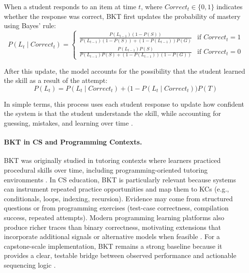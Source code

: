 \documentclass{article}
\begin{document}
When a student responds to an item at time $t$, where $Correct_t \in \{0,1\}$ indicates
whether the response was correct, BKT first updates the probability of mastery using
Bayes’ rule:
\[
P(L_t \mid Correct_t) =
\begin{cases}
\frac{P(L_{t-1})(1-P(S))}{P(L_{t-1})(1-P(S)) + (1-P(L_{t-1}))P(G)} & \text{if } Correct_t = 1 \\
\frac{P(L_{t-1})P(S)}{P(L_{t-1})P(S) + (1-P(L_{t-1}))(1-P(G))} & \text{if } Correct_t = 0
\end{cases}
\]

After this update, the model accounts for the possibility that the student learned the
skill as a result of the attempt:
\[
P(L_t) = P(L_t \mid Correct_t) + \bigl(1 - P(L_t \mid Correct_t)\bigr)P(T)
\]

In simple terms, this process uses each student response to update how confident the system
is that the student understands the skill, while accounting for guessing, mistakes, and
learning over time \cite{corbett1995}.

\paragraph{BKT in CS and Programming Contexts.}
BKT was originally studied in tutoring contexts where learners practiced procedural skills over time,
including programming-oriented tutoring environments \cite{corbett1995}. In CS education, BKT is
particularly relevant because systems can instrument repeated practice opportunities and map them to
KCs (e.g., conditionals, loops, indexing, recursion). Evidence may come from structured questions
or from programming exercises (test-case correctness, compilation success, repeated attempts). Modern
programming learning platforms also produce richer traces than binary correctness, motivating extensions
that incorporate additional signals or alternative models when feasible \cite{piech2015dkt}. For a
capstone-scale implementation, BKT remains a strong baseline because it provides a clear, testable bridge
between observed performance and actionable sequencing logic \cite{corbett1995}.
\end{document}
